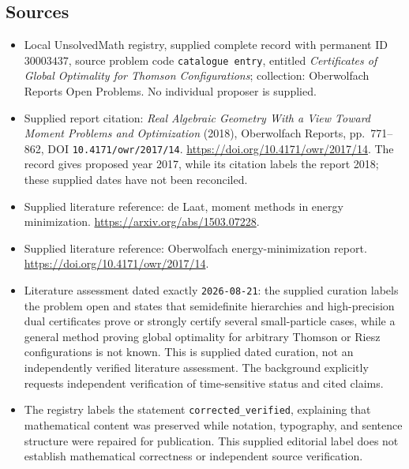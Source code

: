 \documentclass[11pt]{article}
\begin{document}
\subsection{Sources}
\begin{itemize}
\item Local UnsolvedMath registry, supplied complete record with permanent ID \(30003437\), source problem code \texttt{catalogue entry}, entitled \emph{Certificates of Global Optimality for Thomson Configurations}; collection: Oberwolfach Reports Open Problems. No individual proposer is supplied.
\item Supplied report citation: \emph{Real Algebraic Geometry With a View Toward Moment Problems and Optimization} (2018), Oberwolfach Reports, pp.\ 771--862, DOI \texttt{10.4171/owr/2017/14}. \url{https://doi.org/10.4171/owr/2017/14}. The record gives proposed year 2017, while its citation labels the report 2018; these supplied dates have not been reconciled.
\item Supplied literature reference: de Laat, moment methods in energy minimization. \url{https://arxiv.org/abs/1503.07228}.
\item Supplied literature reference: Oberwolfach energy-minimization report. \url{https://doi.org/10.4171/owr/2017/14}.
\item Literature assessment dated exactly \texttt{2026-08-21}: the supplied curation labels the problem open and states that semidefinite hierarchies and high-precision dual certificates prove or strongly certify several small-particle cases, while a general method proving global optimality for arbitrary Thomson or Riesz configurations is not known. This is supplied dated curation, not an independently verified literature assessment. The background explicitly requests independent verification of time-sensitive status and cited claims.
\item The registry labels the statement \texttt{corrected\_verified}, explaining that mathematical content was preserved while notation, typography, and sentence structure were repaired for publication. This supplied editorial label does not establish mathematical correctness or independent source verification.
\end{itemize}
\end{document}
